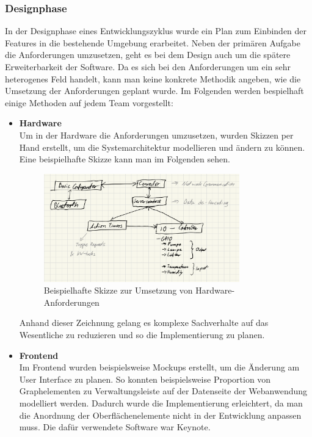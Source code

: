         \subsubsection*{Designphase}
        In der Designphase eines Entwicklungszyklus wurde ein Plan zum Einbinden der Features in die bestehende 
        Umgebung erarbeitet. Neben der primären Aufgabe die Anforderungen umzusetzen, geht es bei dem Design auch 
        um die spätere Erweiterbarkeit der Software. Da es sich bei den Anforderungen um ein sehr heterogenes 
        Feld handelt, kann man keine konkrete Methodik angeben, wie die Umsetzung der Anforderungen geplant
        wurde. Im Folgenden werden bespielhaft einige Methoden auf jedem Team vorgestellt:
        \begin{itemize}
            \item \textbf{Hardware}\\
            Um in der Hardware die Anforderungen umzusetzen, wurden Skizzen per Hand erstellt, um die Systemarchitektur 
            modellieren und ändern zu können. Eine beispielhafte Skizze kann man im Folgenden sehen. 
            
            \begin{figure}[h]
                \centering
                \includegraphics[width=0.8\textwidth]{images/sketch_hardware}
                \caption{Beispielhafte Skizze zur Umsetzung von Hardware-Anforderungen}
                \label{fig:example}
            \end{figure}

            Anhand dieser Zeichnung gelang es komplexe Sachverhalte auf das Wesentliche zu reduzieren und so 
            die Implementierung zu planen. 
            
            
            \item \textbf{Frontend}\\
            Im Frontend wurden beispielsweise Mockups erstellt, um die Änderung am User Interface zu planen. 
            So konnten beispielsweise Proportion von Graphelementen zu Verwaltungsleiste auf der Datenseite der
            Webanwendung modelliert werden. Dadurch wurde die Implementierung erleichtert, da man die Anordnung 
            der Oberflächenelemente nicht in der Entwicklung anpassen muss. Die dafür verwendete Software war 
            Keynote. 


\end{itemize}
